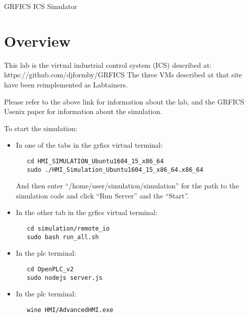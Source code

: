 


\begin{center}
{\LARGE GRFICS ICS Simulator}
\vspace{0.1in}\\
\end{center}

\section{Overview}
This lab is the virtual industrial control system (ICS) described at:
https://github.com/djformby/GRFICS
The three VMs described at that site have been reimplemented as Labtainers.

Please refer to the above link for information about the lab, and the 
GRFICS Usenix paper for information about the simulation.

To start the simulation:
\begin{itemize}
\item In one of the tabs in the grfics virtual terminal:
\begin{verbatim}
   cd HMI_SIMULATION_Ubuntu1604_15_x86_64
   sudo ./HMI_Simulation_Ubuntu1604_15_x86_64.x86_64
\end{verbatim}
\noindent And then enter ``/home/user/simulation/simulation'' for the path
to the simulation code and click ``Run Server'' and the ``Start''.
\item In the other tab in the grfics virtual terminal:
\begin{verbatim}
   cd simulation/remote_io
   sudo bash run_all.sh
\end{verbatim}
\item In the plc terminal:
\begin{verbatim}
   cd OpenPLC_v2
   sudo nodejs server.js
\end{verbatim}
\item In the plc terminal:
\begin{verbatim}
   wine HMI/AdvancedHMI.exe
\end{verbatim}
\end{itemize}

